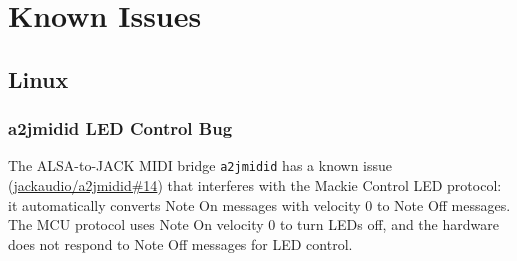 \section{Known Issues}\label{knownissues}

\subsection{Linux}

\subsubsection{a2jmidid LED Control Bug}\label{a2jmidid}

The ALSA-to-JACK MIDI bridge \texttt{a2jmidid} has a known issue
(\href{https://github.com/jackaudio/a2jmidid/issues/14}{jackaudio/a2jmidid\#14})
that interferes with the Mackie Control LED protocol: it automatically
converts Note On messages with velocity 0 to Note Off messages. The
MCU protocol uses Note On velocity 0 to turn LEDs off, and the
hardware does not respond to Note Off messages for LED control.


